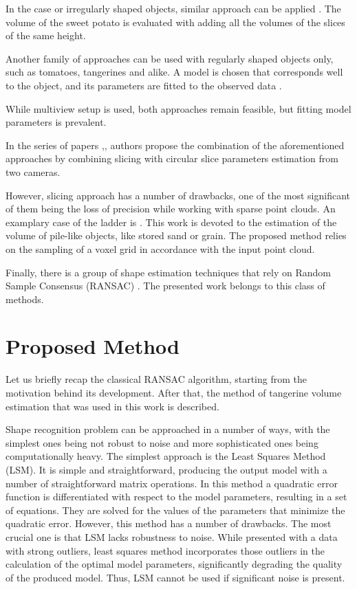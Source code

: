 In the case or irregularly shaped objects, similar approach can be applied \cite{huynh2022vision}.
The volume of the sweet potato is evaluated with adding all the volumes of the slices of the same height.

Another family of approaches can be used with regularly shaped objects only, such as tomatoes, tangerines and alike.
A model is chosen that corresponds well to the object, and its parameters are fitted to the observed data \cite{jana2020novo}.


While multiview setup is used, both approaches remain feasible, but fitting model parameters is prevalent.

In the series of papers \cite{khojastehnazhand2008determination},\cite{khojastehnazhand2010determination},\cite{omid2010estimating} authors propose the combination of the aforementioned approaches by combining slicing with circular slice parameters estimation from two cameras.

However, slicing approach has a number of drawbacks, one of the most significant of them being the loss of precision while working with sparse point clouds.
An examplary case of the ladder is \cite{ling2024divespot}.
This work is devoted to the estimation of the volume of pile-like objects, like stored sand or grain.
The proposed method relies on the sampling of a voxel grid in accordance with the input point cloud.

Finally, there is a group of shape estimation techniques that rely on Random Sample Consensus (RANSAC) \cite{fischler1981}.
The presented work belongs to this class of methods.

\section{Proposed Method}

Let us briefly recap the classical RANSAC algorithm, starting from the motivation behind its development.
After that, the method of tangerine volume estimation that was used in this work is described.

Shape recognition problem can be approached in a number of ways, with the simplest ones being not robust to noise and more sophisticated ones being computationally heavy.
The simplest approach is the Least Squares Method (LSM).
It is simple and straightforward, producing the output model with a number of straightforward matrix operations.
In this method a quadratic error function is differentiated with respect to the model parameters, resulting in a set of equations.
They are solved for the values of the parameters that minimize the quadratic error.
However, this method has a number of drawbacks.
The most crucial one is that LSM lacks robustness to noise.
While presented with a data with strong outliers, least squares method incorporates those outliers in the calculation of the optimal model parameters, significantly degrading the quality of the produced model.
Thus, LSM cannot be used if significant noise is present.

